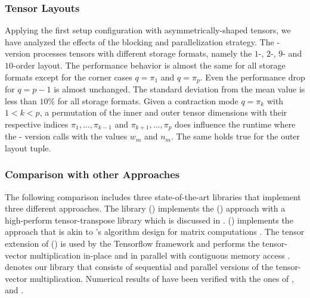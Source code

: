 
\subsubsection{Tensor Layouts}
Applying the first setup configuration with asymmetrically-shaped tensors, we have analyzed the effects of the blocking and parallelization strategy.
The - version processes tensors with different storage formats, namely the $1$-, $2$-, $9$- and $10$-order layout.
The performance behavior is almost the same for all storage formats except for the corner cases $q = \pi_1$ and $q = \pi_p$.
Even the performance drop for $q = p-1$ is almost unchanged.
The standard deviation from the mean value is less than $10$\% for all storage formats.
Given a contraction mode $q = \pi_k$ with $1 < k < p$, a permutation of the inner and outer tensor dimensions with their respective indices $\pi_1, \dots,  \pi_{k-1}$ and $\pi_{k+1}, \dots, \pi_{p}$ does influence the runtime where the - version calls  with the values $w_m$ and $n_m$.
The same holds true for the outer layout tuple.



\subsubsection{Comparison with other Approaches}
The following comparison includes three state-of-the-art libraries that implement three different approaches.
The library  () implements the () approach with a high-perform tensor-transpose library  which is discussed in \cite{springer:2018:design}.
 () implements the  approach that is akin to 's algorithm design for matrix computations \cite{matthews:2018:high}.
The tensor extension of  () is used by the Tensorflow framework and performs the tensor-vector multiplication in-place and in parallel with contiguous memory access \cite{abadi:2016:tensorflow}.
 denotes our library that consists of sequential and parallel versions of the tensor-vector multiplication.
Numerical results of  have been verified with the ones of ,  and .

